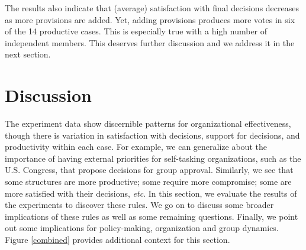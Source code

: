 \documentclass[pdftex,12pt]{llncs}
\begin{document}
The results also indicate that (average) satisfaction with final decisions decreases as more provisions are added.
Yet, adding provisions produces more votes in six of the 14 productive cases. 
This is especially true with a high number of independent members.  
This deserves further discussion and we address it in the next section.



\section{Discussion}
%
The experiment data show discernible patterns for organizational effectiveness, though there is variation in satisfaction with decisions, support for decisions, and productivity within each case.
For example, we can generalize about the importance of having external priorities for self-tasking organizations, such as the U.S. Congress, that propose decisions for group approval. 
Similarly, we see that some structures are more productive; some require more compromise; some are more satisfied with their decisions, \textit{etc}. 
In this section, we evaluate the results of the experiments to discover these rules. 
We go on to discuss some broader implications of these rules as well as some remaining questions.
Finally, we point out some implications for policy-making, organization and group dynamics. 
Figure \ref{combined} provides additional context for this section.
\end{document}
